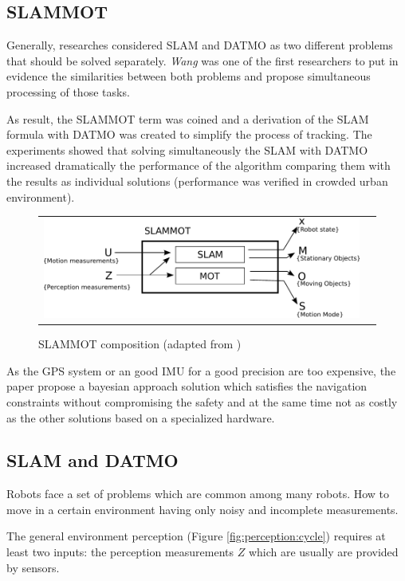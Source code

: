 \subsection{SLAMMOT}

Generally, researches considered SLAM and DATMO as two different problems that should be solved separately. \textit{Wang} was one of the first researchers to put in evidence the similarities between both problems and propose simultaneous processing of those tasks\cite{Wang03onlinesimultaneous}.

As result, the SLAMMOT term was coined and a derivation of the SLAM formula with DATMO was created to simplify the process of tracking. The experiments showed that solving simultaneously the SLAM with DATMO increased dramatically the performance of the algorithm comparing them with the results as individual solutions (performance was verified in crowded urban environment).

\begin{figure}[h]
   \centering
     \begin{tabular}{lr}
       \includegraphics[scale=0.9]{img/fig:slammot}
     \end{tabular}
   \caption{SLAMMOT composition (adapted from \cite{Wang04a})}
   \label{fig:slammot}
 \end{figure}

As the GPS system or an good IMU for a good precision are too expensive, the paper propose a bayesian approach solution which satisfies the navigation constraints without compromising the safety and at the same time not as costly as the other solutions based on a specialized hardware.

\subsection{SLAM and DATMO}

Robots face a set of problems which are common among many robots. How to move in a certain environment having only noisy and incomplete measurements.

The general environment perception (Figure \ref{fig:perception:cycle}) requires at least two inputs: the perception measurements $Z$ which are usually are provided by sensors.

